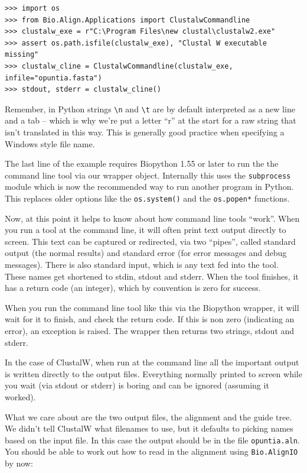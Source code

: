\documentclass{report}
\begin{document}
\begin{verbatim}
>>> import os
>>> from Bio.Align.Applications import ClustalwCommandline
>>> clustalw_exe = r"C:\Program Files\new clustal\clustalw2.exe"
>>> assert os.path.isfile(clustalw_exe), "Clustal W executable missing"
>>> clustalw_cline = ClustalwCommandline(clustalw_exe, infile="opuntia.fasta")
>>> stdout, stderr = clustalw_cline()
\end{verbatim}

\noindent Remember, in Python strings \verb|\n| and \verb|\t| are by default
interpreted as a new line and a tab -- which is why we're put a letter
``r'' at the start for a raw string that isn't translated in this way.
This is generally good practice when specifying a Windows style file name.

The last line of the example requires Biopython 1.55 or later to run the
the command line tool via our wrapper object. Internally this uses the
\verb|subprocess| module which is now the recommended way to run another
program in Python. This replaces older options like the \verb|os.system()|
and the \verb|os.popen*| functions.

Now, at this point it helps to know about how command line tools ``work''.
When you run a tool at the command line, it will often print text output
directly to screen. This text can be captured or redirected, via
two ``pipes'', called standard output (the normal results) and standard
error (for error messages and debug messages). There is also standard
input, which is any text fed into the tool. These names get shortened
to stdin, stdout and stderr. When the tool finishes, it has a return
code (an integer), which by convention is zero for success.

When you run the command line tool like this via the Biopython wrapper,
it will wait for it to finish, and check the return code. If this is
non zero (indicating an error), an exception is raised. The wrapper
then returns two strings, stdout and stderr.

In the case of ClustalW, when run at the command line all the important
output is written directly to the output files. Everything normally printed to
screen while you wait (via stdout or stderr) is boring and can be
ignored (assuming it worked).

What we care about are the two output files, the alignment and the guide
tree. We didn't tell ClustalW what filenames to use, but it defaults to
picking names based on the input file. In this case the output should be
in the file \verb|opuntia.aln|.
You should be able to work out how to read in the alignment using
\verb|Bio.AlignIO| by now:
\end{document}
